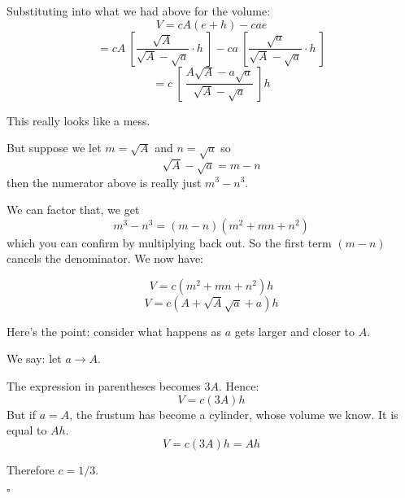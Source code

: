 \documentclass[11pt, oneside]{article}
\begin{document}
Substituting into what we had above for the volume:
\[ V = cA(e+h) - cae \]
\[ = cA \ [ \frac{\sqrt{A}}{\sqrt{A} - \sqrt{a}} \cdot h \ ] - ca \ [ \frac{\sqrt{a}}{\sqrt{A} - \sqrt{a}}  \cdot h \ ] \]
\[ = c \ [ \   \frac{A \sqrt{A} - a \sqrt{a}}{\sqrt{A} - \sqrt{a}} \ ] h \]

This really looks like a mess.  

But suppose we let $m =  \sqrt{A}$ and $n =  \sqrt{a}$ so
\[ \sqrt{A} - \sqrt{a} = m - n \]
then the numerator above is really just $m^3 - n^3$.    

We can factor that, we get 
\[ m^3 - n^3 = (m-n)(m^2 + mn + n^2) \]
which you can confirm by multiplying back out.  So the first term $(m-n)$ cancels the denominator.  We now have:

\[ V = c (m^2 + mn + n^2) h \]
\[ V = c (A + \sqrt{A} \sqrt{a} + a) h \]

Here's the point:  consider what happens as $a$ gets larger and closer to $A$.

We say:  let $a \rightarrow A$.

The expression in parentheses becomes $3A$.  Hence:
\[ V = c(3A)h \]
But if $a = A$, the frustum has become a cylinder, whose volume we know.  It is equal to $Ah$. 
\[ V = c(3A)h = Ah \]

Therefore $c = 1/3$.

$\square$
\end{document}
